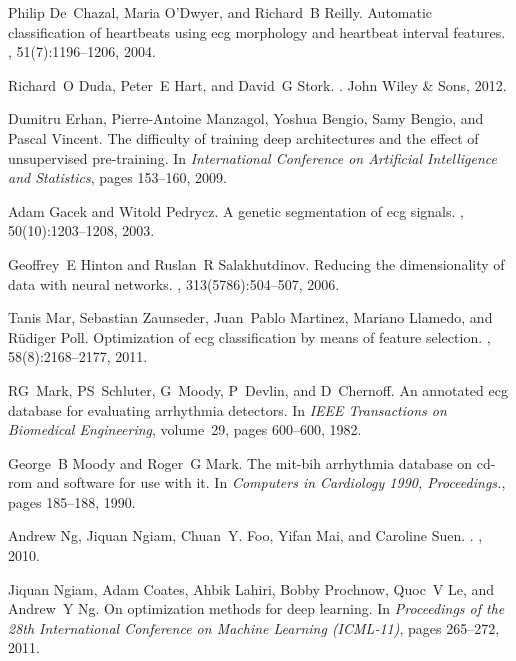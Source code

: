 \begin{thebibliography}{99.}
Philip De~Chazal, Maria O'Dwyer, and Richard~B Reilly.
\newblock Automatic classification of heartbeats using ecg morphology and
  heartbeat interval features.
, 51(7):1196--1206,
  2004.

Richard~O Duda, Peter~E Hart, and David~G Stork.
.
\newblock John Wiley \& Sons, 2012.

Dumitru Erhan, Pierre-Antoine Manzagol, Yoshua Bengio, Samy Bengio, and Pascal
  Vincent.
\newblock The difficulty of training deep architectures and the effect of
  unsupervised pre-training.
\newblock In {\em International Conference on Artificial Intelligence and
  Statistics}, pages 153--160, 2009.

Adam Gacek and Witold Pedrycz.
\newblock A genetic segmentation of ecg signals.
,
  50(10):1203--1208, 2003.

Geoffrey~E Hinton and Ruslan~R Salakhutdinov.
\newblock Reducing the dimensionality of data with neural networks.
, 313(5786):504--507, 2006.

Tanis Mar, Sebastian Zaunseder, Juan~Pablo Martinez, Mariano Llamedo, and
  R{\"u}diger Poll.
\newblock Optimization of ecg classification by means of feature selection.
, 58(8):2168--2177,
  2011.

RG~Mark, PS~Schluter, G~Moody, P~Devlin, and D~Chernoff.
\newblock An annotated ecg database for evaluating arrhythmia detectors.
\newblock In {\em IEEE Transactions on Biomedical Engineering}, volume~29,
  pages 600--600, 1982.

George~B Moody and Roger~G Mark.
\newblock The mit-bih arrhythmia database on cd-rom and software for use with
  it.
\newblock In {\em Computers in Cardiology 1990, Proceedings.}, pages 185--188,
  1990.

Andrew Ng, Jiquan Ngiam, Chuan~Y. Foo, Yifan Mai, and Caroline Suen.
.
, 2010.

Jiquan Ngiam, Adam Coates, Ahbik Lahiri, Bobby Prochnow, Quoc~V Le, and
  Andrew~Y Ng.
\newblock On optimization methods for deep learning.
\newblock In {\em Proceedings of the 28th International Conference on Machine
  Learning (ICML-11)}, pages 265--272, 2011.


\end{thebibliography}
